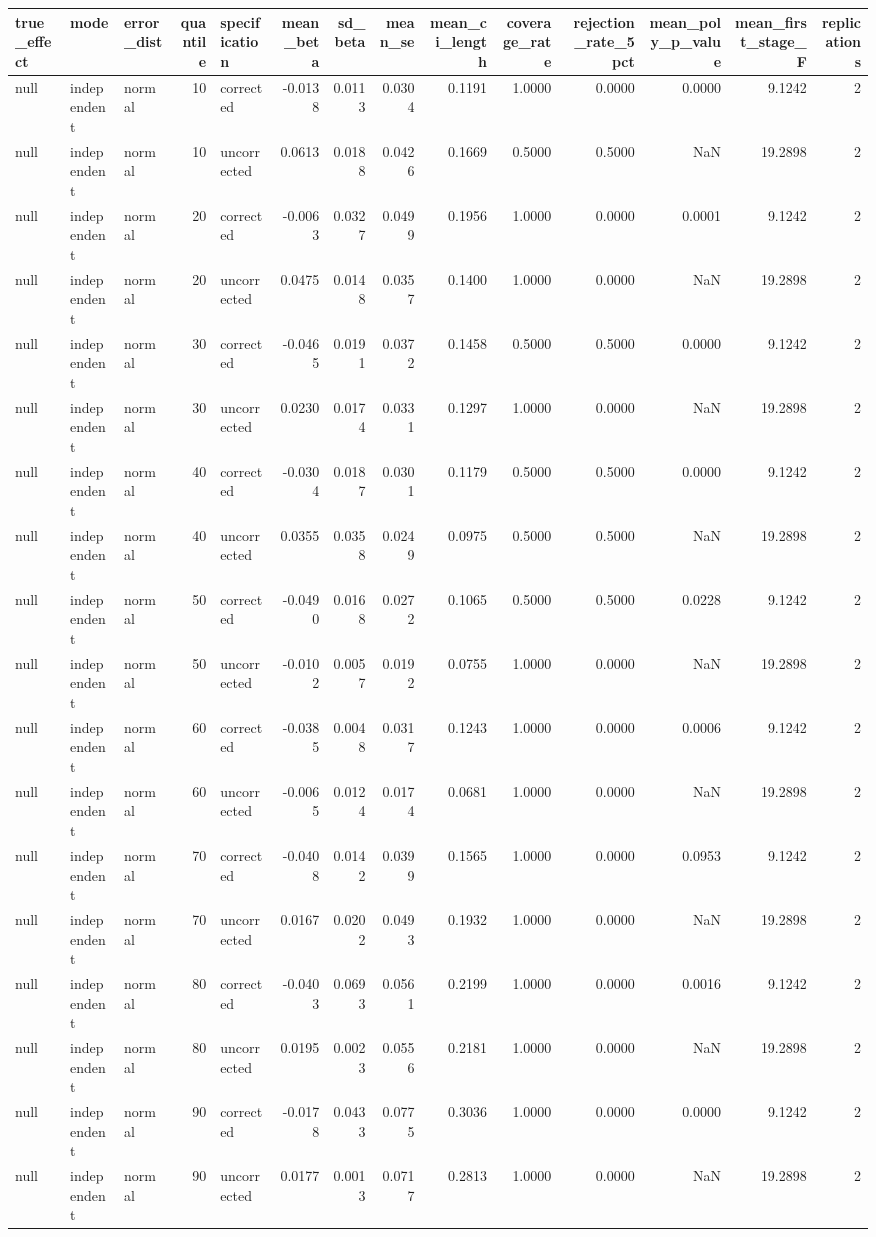 \begin{tabular}{lllrlrrrrrrrrr}
\toprule
true_effect & mode & error_dist & quantile & specification & mean_beta & sd_beta & mean_se & mean_ci_length & coverage_rate & rejection_rate_5pct & mean_poly_p_value & mean_first_stage_F & replications \\
\midrule
null & independent & normal & 10 & corrected & -0.0138 & 0.0113 & 0.0304 & 0.1191 & 1.0000 & 0.0000 & 0.0000 & 9.1242 & 2 \\
null & independent & normal & 10 & uncorrected & 0.0613 & 0.0188 & 0.0426 & 0.1669 & 0.5000 & 0.5000 & NaN & 19.2898 & 2 \\
null & independent & normal & 20 & corrected & -0.0063 & 0.0327 & 0.0499 & 0.1956 & 1.0000 & 0.0000 & 0.0001 & 9.1242 & 2 \\
null & independent & normal & 20 & uncorrected & 0.0475 & 0.0148 & 0.0357 & 0.1400 & 1.0000 & 0.0000 & NaN & 19.2898 & 2 \\
null & independent & normal & 30 & corrected & -0.0465 & 0.0191 & 0.0372 & 0.1458 & 0.5000 & 0.5000 & 0.0000 & 9.1242 & 2 \\
null & independent & normal & 30 & uncorrected & 0.0230 & 0.0174 & 0.0331 & 0.1297 & 1.0000 & 0.0000 & NaN & 19.2898 & 2 \\
null & independent & normal & 40 & corrected & -0.0304 & 0.0187 & 0.0301 & 0.1179 & 0.5000 & 0.5000 & 0.0000 & 9.1242 & 2 \\
null & independent & normal & 40 & uncorrected & 0.0355 & 0.0358 & 0.0249 & 0.0975 & 0.5000 & 0.5000 & NaN & 19.2898 & 2 \\
null & independent & normal & 50 & corrected & -0.0490 & 0.0168 & 0.0272 & 0.1065 & 0.5000 & 0.5000 & 0.0228 & 9.1242 & 2 \\
null & independent & normal & 50 & uncorrected & -0.0102 & 0.0057 & 0.0192 & 0.0755 & 1.0000 & 0.0000 & NaN & 19.2898 & 2 \\
null & independent & normal & 60 & corrected & -0.0385 & 0.0048 & 0.0317 & 0.1243 & 1.0000 & 0.0000 & 0.0006 & 9.1242 & 2 \\
null & independent & normal & 60 & uncorrected & -0.0065 & 0.0124 & 0.0174 & 0.0681 & 1.0000 & 0.0000 & NaN & 19.2898 & 2 \\
null & independent & normal & 70 & corrected & -0.0408 & 0.0142 & 0.0399 & 0.1565 & 1.0000 & 0.0000 & 0.0953 & 9.1242 & 2 \\
null & independent & normal & 70 & uncorrected & 0.0167 & 0.0202 & 0.0493 & 0.1932 & 1.0000 & 0.0000 & NaN & 19.2898 & 2 \\
null & independent & normal & 80 & corrected & -0.0403 & 0.0693 & 0.0561 & 0.2199 & 1.0000 & 0.0000 & 0.0016 & 9.1242 & 2 \\
null & independent & normal & 80 & uncorrected & 0.0195 & 0.0023 & 0.0556 & 0.2181 & 1.0000 & 0.0000 & NaN & 19.2898 & 2 \\
null & independent & normal & 90 & corrected & -0.0178 & 0.0433 & 0.0775 & 0.3036 & 1.0000 & 0.0000 & 0.0000 & 9.1242 & 2 \\
null & independent & normal & 90 & uncorrected & 0.0177 & 0.0013 & 0.0717 & 0.2813 & 1.0000 & 0.0000 & NaN & 19.2898 & 2 \\
\bottomrule
\end{tabular}
